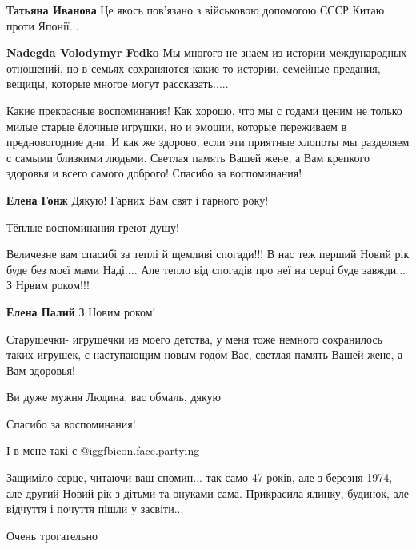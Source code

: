 \begin{itemize}
\begin{itemize}
\begin{itemize}
\textbf{Татьяна Иванова} Це якось пов'язано з військовою допомогою СССР Китаю проти Японії...

\textbf{Nadegda Volodymyr Fedko} Мы многого не знаем из истории международных отношений, но в семьях сохраняются какие-то истории, семейные предания, вещицы, которые многое могут рассказать.....
\end{itemize} %

\end{itemize} %


Какие прекрасные воспоминания! Как хорошо, что мы с годами ценим не только
милые старые ёлочные игрушки, но и эмоции, которые переживаем в предновогодние
дни. И как же здорово, если эти приятные хлопоты мы разделяем с самыми близкими
людьми. Светлая память Вашей жене, а Вам крепкого здоровья и всего самого
доброго! Спасибо за воспоминания!

\textbf{Елена Гонж} Дякую! Гарних Вам свят і гарного року!

Тёплые воспоминания греют душу!


Величезне вам спасибі за теплі й щемливі спогади!!! В нас теж перший Новий рік
буде без моєї мами Наді.... Але тепло від спогадів про неї на серці буде
завжди... З Нрвим роком!!!

\textbf{Елена Палий} З Новим роком!


Старушечки- игрушечки из моего детства, у меня тоже немного сохранилось таких
игрушек, с наступающим новым годом Вас, светлая память Вашей жене, а Вам здоровья!


Ви дуже мужня Людина, вас обмаль, дякую

Спасибо за воспоминания!


І в мене такі є  @igg{fbicon.face.partying} 


Защиміло серце, читаючи ваш спомин... так само 47 років, але з березня 1974, але
другий Новий рік з дітьми та онуками сама. Прикрасила ялинку, будинок, але
відчуття і почуття пішли у засвіти...

Очень трогательно


\end{itemize}
